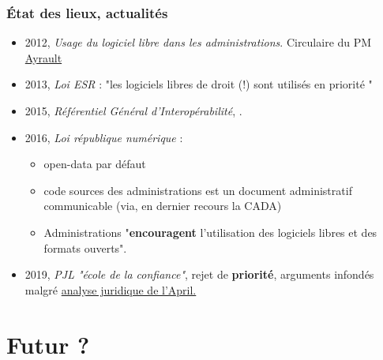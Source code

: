 \documentclass{beamer}
\begin{document}
\begin{frame}\frametitle{État des lieux, actualités}

  \begin{itemize}
  \item 2012, \textit{Usage du logiciel libre dans les
      administrations}. Circulaire du PM
    \href{http://circulaire.legifrance.gouv.fr/pdf/2012/09/cir_35837.pdf}{{\color{blue}Ayrault}}
  \item 2013, \textit{Loi ESR} : "les logiciels libres de droit (!)
    sont utilisés en priorité "
  \item 2015, \textit{Référentiel Général d'Interopérabilité},
    \href{http://references.modernisation.gouv.fr/sites/default/files/Referentiel_General_Interoperabilite_V2.pdf}{\color{blue}{RGIv2}}.
  \item 2016, \textit{Loi république numérique} :
    \begin{itemize}
    \item open-data par défaut
    \item code sources des administrations est un document
      administratif communicable (via, en dernier recours la CADA)
    \item Administrations "\textbf{encouragent} l'utilisation des
      logiciels libres et des formats ouverts".
    \end{itemize}
  \item 2019, \textit{PJL "école de la confiance"}, rejet de
    \textbf{priorité}, arguments infondés malgré
    \href{https://www.april.org/sites/default/files/20130612-note-legalite-disposition-legislative.pdf}{{\color{blue}analyse
        juridique de l'April.}}

  \end{itemize}

  
\end{frame}


\section{Futur ?}
\end{document}

